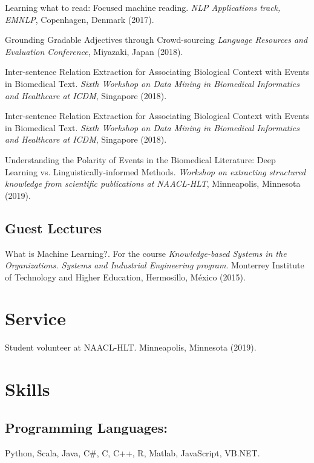 \documentclass[letterpaper]{article}
\renewenvironment{itemize}{
  \begin{list}{}{
    \setlength{\leftmargin}{1.5em}
  }
}{
  \end{list}
}
\begin{document}
\begin{itemize}
	
\item Learning what to read: Focused machine reading. \textit{NLP Applications track, EMNLP}, Copenhagen, Denmark (2017).
\item Grounding Gradable Adjectives through Crowd-sourcing \textit{Language Resources and Evaluation Conference}, Miyazaki, Japan (2018).
\item Inter-sentence Relation Extraction for Associating Biological Context with Events in Biomedical Text. \textit{Sixth Workshop on Data Mining in Biomedical Informatics and Healthcare at ICDM}, Singapore (2018).
\item Inter-sentence Relation Extraction for Associating Biological Context with Events in Biomedical Text. \textit{Sixth Workshop on Data Mining in Biomedical Informatics and Healthcare at ICDM}, Singapore (2018).
\item Understanding the Polarity of Events in the Biomedical Literature: Deep Learning vs. Linguistically-informed Methods. \textit{Workshop on extracting structured knowledge from scientific publications at NAACL-HLT}, Minneapolis, Minnesota (2019).
\end{itemize}

\subsection*{Guest Lectures}
\begin{itemize}
	\item What is Machine Learning?. For the course \textit{Knowledge-based Systems in the Organizations. Systems and Industrial Engineering program}. Monterrey Institute of Technology and Higher Education, Hermosillo, M\'{e}xico (2015).
\end{itemize}

\section*{Service}
\begin{itemize}
	\item Student volunteer at NAACL-HLT. Minneapolis, Minnesota (2019).
\end{itemize}
\section*{Skills}
\subsection*{Programming Languages:}
\begin{itemize}
	\item Python, Scala, Java, C\#, C, C++, R, Matlab, JavaScript, VB.NET.
\end{itemize}
\vspace{-2em}
\end{document}
